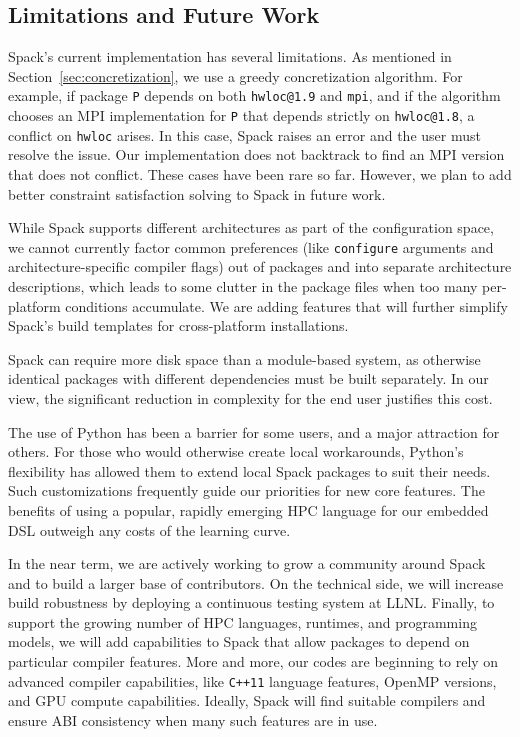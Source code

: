 
\subsection{Limitations and Future Work}

Spack's current implementation has several limitations.
As mentioned in Section~\ref{sec:concretization}, we use a greedy 
concretization algorithm. For example, if package {\tt P} depends on 
both {\tt hwloc@1.9} and {\tt mpi}, and if the algorithm
chooses an MPI implementation for {\tt P} that depends strictly on
{\tt hwloc@1.8}, a conflict on {\tt hwloc} arises. In this case, Spack 
raises an error and the user must resolve the issue. Our implementation 
does not backtrack to find an MPI version that does not conflict. These 
cases have been rare so far. However, we plan to add better constraint
satisfaction solving to Spack in future work.

While Spack supports different architectures as part of the 
configuration space, we cannot currently factor common preferences (like 
{\tt configure} arguments and architecture-specific compiler flags) out of 
packages and into separate architecture descriptions, which leads to some 
clutter in the package files when too many per-platform conditions accumulate.
We are adding features that will further simplify Spack's build templates
for cross-platform installations.

Spack can require more disk space than a module-based system, as otherwise 
identical packages with different dependencies must be built separately. In 
our view, the significant reduction in complexity for the end user justifies 
this cost.

The use of Python has been a barrier for some users, and
a major attraction for others. For those who would otherwise create local
workarounds, Python's flexibility has allowed them to extend local
Spack packages to suit their needs. Such customizations frequently
guide our priorities for new core features. The
benefits of using a popular, rapidly emerging HPC language for our
embedded DSL outweigh any costs of the learning curve.

In the near term, we are actively working to grow a community around Spack 
and to build a larger base of contributors. On the technical side, we will
increase build robustness by deploying a continuous testing system
at LLNL.  Finally, to support the growing number of
HPC languages, runtimes, and programming models, we will add
capabilities to Spack that allow packages to depend on particular
compiler features.  More and more, our codes are beginning to rely
on advanced compiler capabilities, like {\tt C++11} language features,
OpenMP versions, and GPU compute capabilities. Ideally, Spack
will find suitable compilers and ensure ABI consistency when many
such features are in use.
